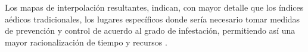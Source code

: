 Los mapas de interpolación resultantes, indican, con mayor detalle que los índices aédicos
tradicionales, los lugares específicos donde sería necesario tomar medidas de prevención y
control de acuerdo al grado de infestación, permitiendo así una mayor racionalización de tiempo y
recursos \cite{NINO2011}.
